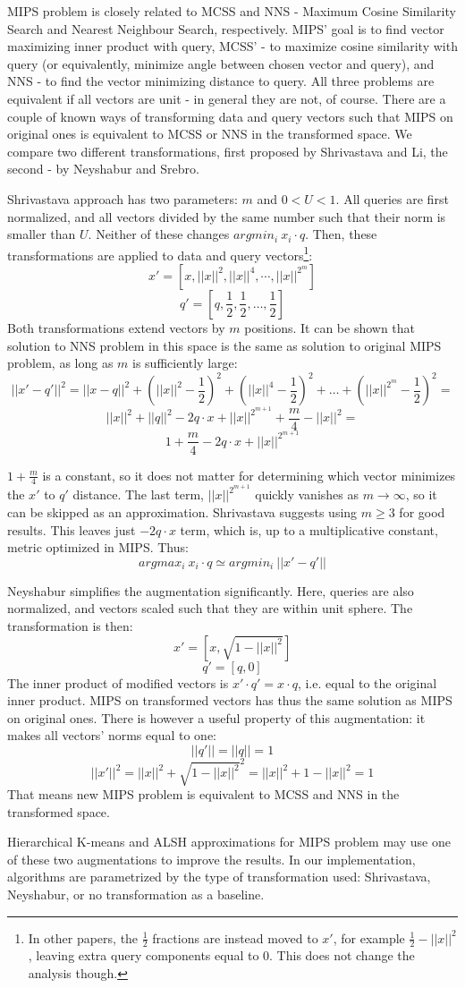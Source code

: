MIPS problem is closely related to MCSS and NNS - Maximum Cosine
Similarity Search and Nearest Neighbour Search, respectively.
MIPS' goal is to find vector maximizing inner product with query,
MCSS' - to maximize cosine similarity with query (or equivalently,
minimize angle between chosen vector and query), and NNS - to find
the vector minimizing distance to query. All three problems are
equivalent if all vectors are unit - in general they are not, of course.
There are a couple of known ways
of transforming data and query vectors such that MIPS on original ones
is equivalent to MCSS or NNS in the transformed space. We compare two different
transformations, first proposed by Shrivastava and Li, the second - by
Neyshabur and Srebro.

Shrivastava approach has two parameters: $m$ and $0 < U < 1$. All queries
are first normalized, and all vectors divided by the same number such that
their norm is smaller than $U$. Neither of these changes
$argmin_i\ x_i \cdot q$. Then, these transformations are applied to data
and query vectors\footnote{In other papers, the $\frac{1}{2}$ fractions are
instead moved to $x'$, for example $\frac{1}{2} - ||x||^2$, leaving extra
query components equal to 0. This does not change the analysis though.}:
$$
x' = [x, ||x||^2, ||x||^4, \cdots, ||x||^{2^m}]
$$
$$
q' = [q, \frac{1}{2}, \frac{1}{2}, \dots, \frac{1}{2}]
$$
Both transformations extend vectors by $m$ positions. It can be shown that
solution to NNS problem in this space is the same as solution to original
MIPS problem, as long as $m$ is sufficiently large:
$$
||x' - q'||^2 = ||x - q||^2 +
(||x||^2 - \frac{1}{2})^2 + (||x||^4 - \frac{1}{2})^2 + \dots + 
(||x||^{2^m} - \frac{1}{2})^2 =
$$
$$
||x||^2 + ||q||^2 - 2 q \cdot x
+ ||x||^{2^{m+1}} + \frac{m}{4} - ||x||^2 =
$$
$$
1 + \frac{m}{4} - 2 q \cdot x + ||x||^{2^{m+1}}
$$

$ 1 + \frac{m}{4} $ is a constant, so it does not matter for determining 
which vector minimizes the $x'$ to $q'$ distance. The last term, 
$||x||^{2^{m+1}}$ quickly vanishes as $m \to \infty$, so it can be skipped
as an approximation. Shrivastava suggests using $m \ge 3$ for good results.
This leaves just $ - 2 q \cdot x $ term, which is, up to a multiplicative
constant, metric optimized in MIPS.
Thus:
$$
argmax_i\ x_i \cdot q \simeq argmin_i\ ||x' - q'||
$$

Neyshabur simplifies the augmentation significantly. Here, queries are also
normalized, and vectors scaled such that they are within unit sphere. The
transformation is then:
$$
x' = [x, \sqrt{1 - ||x||^2}]
$$
$$
q' = [q, 0]
$$
The inner product of modified vectors is $x' \cdot q' = x \cdot q$, i.e. equal
to the original inner product. MIPS on transformed vectors has thus the same
solution as MIPS on original ones. There is however a useful property of this
augmentation: it makes all vectors' norms equal to one: 
$$ ||q'|| = ||q|| = 1 $$
$$ ||x'||^2 = ||x||^2 + \sqrt{1 - ||x||^2}^2 = ||x||^2 + 1 - ||x||^2 = 1 $$
That means new MIPS problem is equivalent to MCSS and NNS in the transformed
space.

Hierarchical K-means and ALSH approximations for MIPS problem may use one
of these two augmentations to improve the results. In our implementation,
algorithms are parametrized by the type of transformation used: Shrivastava,
Neyshabur, or no transformation as a baseline.
